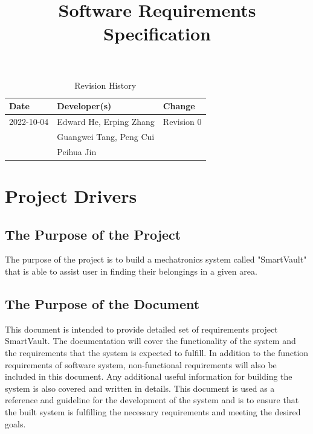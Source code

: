 \documentclass[12pt]{article}
\title{Software Requirements Specification\\\progname}
\author{\authname}
\date{}
\begin{document}
\maketitle

\newpage
\begin{table}[hp]
\caption{Revision History} \label{TblRevisionHistory}
\begin{tabularx}{\textwidth}{llX}
\toprule
\textbf{Date} & \textbf{Developer(s)} & \textbf{Change}\\
\midrule
2022-10-04 & Edward He, Erping Zhang & Revision 0\\
& Guangwei Tang, Peng Cui & \\
& Peihua Jin & \\
\bottomrule
\end{tabularx}
\end{table}

\newpage


\tableofcontents

\newpage



\listoftables
\listoffigures

\newpage




\begin{table}

\end{table}

\section{Project Drivers}

\subsection{The Purpose of the Project}
The purpose of the project is to build a mechatronics system called "SmartVault" that is able to assist user in finding their belongings in a given area. 
\subsection{The Purpose of the Document}
This document is intended to provide detailed set of requirements project SmartVault. The documentation will cover the functionality of the system and the requirements that the system is expected to fulfill. In addition to the function requirements of software system, non-functional requirements will also be included in this document. Any additional useful information for building the system is also covered and written in details. This document is used as a reference and guideline for the development of the system and is to ensure that the built system is fulfilling the necessary requirements and meeting the desired goals.
\end{document}
